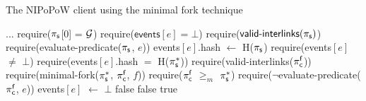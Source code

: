 \begin{algorithm}
    \caption{\label{alg:minimal-fork}The \textsf{NIPoPoW} client using the minimal fork technique}

    \begin{algorithmic}[1]

    \State ...
        \State \textsf{require}($\mathsf{\pi_{s}}$[0] = $\mathcal{G}$)
        \State \textsf{require}($\textsf{events$[e]$} = \bot$)
        \State \textsf{require}($\textsf{valid-interlinks}(\mathsf{\pi_{s}})$)
        \State \textsf{require}(\textsf{evaluate-predicate}(\textsf{$\mathsf{\pi_{s}}$},
        $e$))
        \State \textsf{events$[e]$.hash} $\gets$ \textsf{H}($\mathsf{\pi_{s}}$)
    \EndFunction
        \State \textsf{require}(\textsf{events}$[e]$ $\ne$ $\bot$)
        \State \textsf{require}(\textsf{events$[e]$.hash} $=$ \textsf{H}($\mathsf{\pi_{s}^*}$))
        \State \textsf{require}(\textsf{valid-interlinks}($\mathsf{\pi_{c}^{f}}$))
        \State \textsf{require}(\textsf{minimal-fork}($\mathsf{\pi_{s}^*}$,
        $\mathsf{\pi_{c}^{f}}$, $f$))
        \State \textsf{require}($\mathsf{\pi_{c}^{f}}$ $\geq_m$ $\mathsf{\pi_{s}^*}$)
        \State \textsf{require}(\textsf{$\neg$evaluate-predicate}($\mathsf{\pi_{c}^{f}}$, $e$))
        \State \textsf{events$[e]$} $\gets$ $\bot$
    \EndFunction
        \State\Return false
    \EndIf
            \State\Return false
        \EndIf
    \EndFor
    \State\Return true
    \EndFunction
    \EndContract
    \vskip8pt
    \end{algorithmic}
\end{algorithm}

